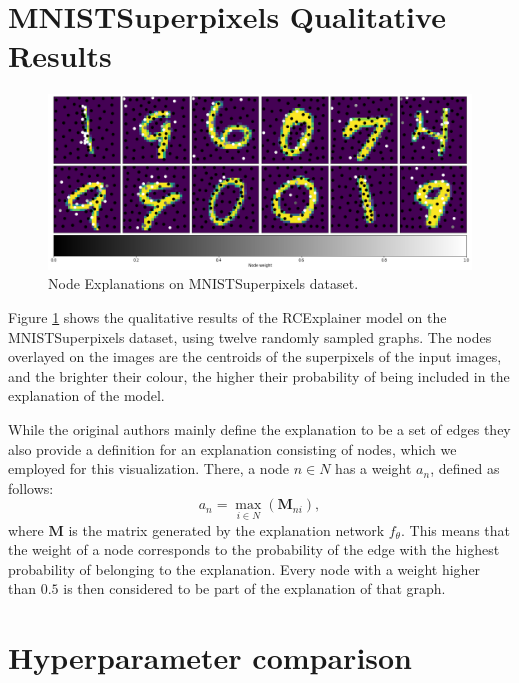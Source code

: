 \newpage
\section{MNISTSuperpixels Qualitative Results}
\begin{figure}[!htbp]
    \centerline{\includegraphics[width=1\textwidth]{Images/MNISTGrid_bigboy.png}}
    \caption{Node Explanations on MNISTSuperpixels dataset.}
    \label{fig:qual_MNIST}
\end{figure}

Figure \ref{fig:qual_MNIST} shows the qualitative results of the RCExplainer model on the MNISTSuperpixels dataset, using twelve randomly sampled graphs. The nodes overlayed on the images are the centroids of the superpixels of the input images, and the brighter their colour, the higher their probability of being included in the explanation of the model.

\noindent While the original authors mainly define the explanation to be a set of edges they also provide a definition for an explanation consisting of nodes, which we employed for this visualization. There, a node $n \in N$ has a weight $a_{n}$, defined as follows:
\begin{equation}
    a_{n} = \max_{i \in N}(\textbf{M}_{ni}),
\end{equation}
where $\textbf{M}$ is the matrix generated by the explanation network $f_{\theta}$. This means that the weight of a node corresponds to the probability of the edge with the highest probability of belonging to the explanation. Every node with a weight higher than $0.5$ is then considered to be part of the explanation of that graph.

\newpage

\section{Hyperparameter comparison} \label{appendix:hyperparameters}

